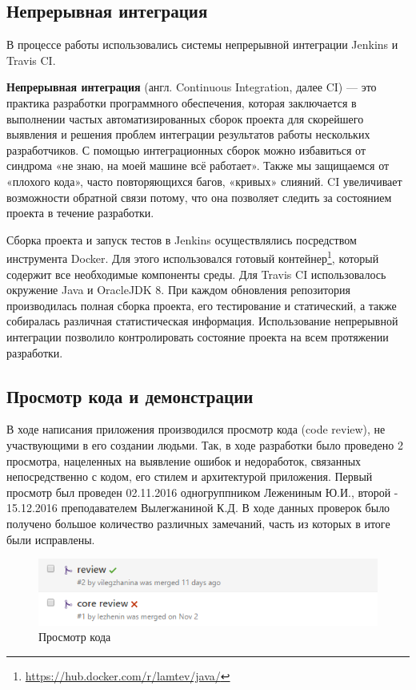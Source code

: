 \subsection{Непрерывная интеграция}

В процессе работы использовались системы непрерывной интеграции Jenkins и Travis CI.

\textbf{Непрерывная интеграция} (англ. Continuous Integration, далее CI) — это практика разработки программного обеспечения, которая заключается в выполнении частых автоматизированных сборок проекта для скорейшего выявления и решения проблем интеграции результатов работы нескольких разработчиков. С помощью интеграционных сборок можно избавиться от синдрома «не знаю, на моей машине всё работает». Также мы защищаемся от «плохого кода», часто повторяющихся багов, «кривых» слияний. CI увеличивает возможности обратной связи потому, что она позволяет следить за состоянием проекта в течение разработки.

Сборка проекта и запуск тестов в Jenkins осуществлялись посредством инструмента Docker. Для этого использовался готовый контейнер\footnote{\url{https://hub.docker.com/r/lamtev/java/}}, который содержит все необходимые компоненты среды. Для Travis CI использовалось окружение Java и OracleJDK 8. При каждом обновления репозитория производилась полная сборка проекта, его тестирование и статический, а также собиралась различная статистическая информация. Использование непрерывной интеграции позволило контролировать состояние проекта на всем протяжении разработки.  

\subsection{Просмотр кода и демонстрации}

В ходе написания приложения производился просмотр кода (code review), не участвующими в его создании людьми. Так, в ходе разработки было проведено 2 просмотра, нацеленных на выявление ошибок и недоработок, связанных  непосредственно с кодом, его стилем и архитектурой приложения. Первый просмотр был проведен 02.11.2016 одногруппником Лежениным Ю.И., второй - 15.12.2016 преподавателем Вылегжаниной К.Д. В ходе данных проверок было получено большое количество различных замечаний, часть из которых в итоге были исправлены.

\begin{figure}[H]
	\begin{center}
		\includegraphics[scale=0.85]{pics/review}
		\caption{Просмотр кода} 
		\label{pic:findbugs} %
	\end{center}
\end{figure}


